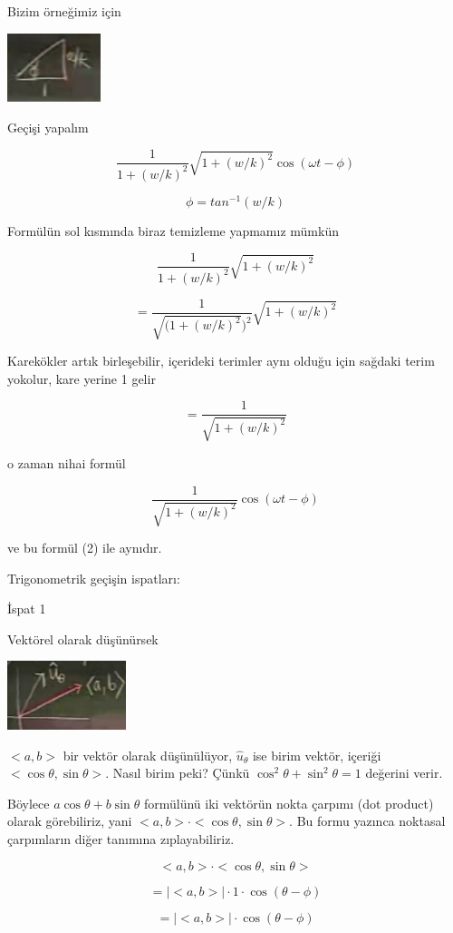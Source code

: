 \documentclass[12pt,fleqn]{article}\usepackage{../../common}
\begin{document}
Bizim örneğimiz için

\includegraphics[height=2cm]{8_2.png}

Geçişi yapalım

$$ \frac{1}{1+(w/k)^2} \sqrt{1+(w/k)^2} \cos (\omega t - \phi) $$

$$ \phi = tan^{-1}(w/k) $$

Formülün sol kısmında biraz temizleme yapmamız mümkün

$$ \frac{1}{1+(w/k)^2} \sqrt{1+(w/k)^2} $$

$$ = \frac{1}{ \sqrt{ \bigg(1+(w/k)^2} \bigg)^2} \sqrt{1+(w/k)^2} $$

Karekökler artık birleşebilir, içerideki terimler aynı olduğu için sağdaki
terim yokolur, kare yerine 1 gelir

$$ = \frac{1}{\sqrt{1+(w/k)^2}} $$

o zaman nihai formül

$$ \frac{1}{\sqrt{1+(w/k)^2}} \cos (\omega t - \phi) $$

ve bu formül (2) ile aynıdır.

Trigonometrik geçişin ispatları:

İspat 1

Vektörel olarak düşünürsek

\includegraphics[height=2cm]{8_3.png}

$<a,b>$ bir vektör olarak düşünülüyor, $\hat{u}_\theta$ ise birim vektör,
içeriği $<\cos \theta, \sin \theta>$. Nasıl birim peki? Çünkü $\cos^2\theta +
\sin^2\theta = 1$ değerini verir.

Böylece $a \cos \theta + b \sin \theta$ formülünü iki vektörün nokta çarpımı
(dot product) olarak görebiliriz, yani $<a,b> \cdot <\cos \theta, \sin \theta>$. 
Bu formu yazınca noktasal çarpımların diğer tanımına zıplayabiliriz.

$$ < a,b > \cdot < \cos \theta, \sin \theta > $$

$$ = |< a,b >| \cdot 1 \cdot \cos(\theta - \phi) $$

$$ = |< a,b >| \cdot \cos(\theta - \phi) $$
\end{document}
